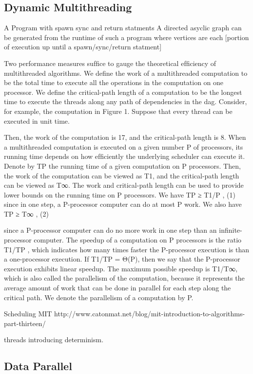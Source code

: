 \documentclass[main.tex]{subfiles}
\begin{document}
{{\subsection{Dynamic Multithreading}

A Program with spawn sync and return statments
A directed asyclic graph can be generated from the runtime of such a program where vertices are each [portion of execution up until a spawn/sync/return statment]

Two performance measures sufﬁce to gauge the theoretical efﬁciency of multithreaded algorithms. We deﬁne the work  of a multithreaded computation to be the total time to execute all the operations in the computation on one processor. We deﬁne the critical-path length  of a computation to be the longest time to execute the threads along any path of dependencies in the dag. Consider, for example, the computation in Figure 1. Suppose that every thread can be executed in unit time.

Then, the work of the computation is 17, and the critical-path length is 8. When a multithreaded computation is executed on a given number P of processors, its running time depends on how efﬁciently the underlying scheduler can execute it. Denote by TP the running time of a given computation on P processors. Then, the work of the computation can be viewed as T1, and the critical-path length can be viewed as T∞. The work and critical-path length can be used to provide lower bounds on the running time on P processors.
We have TP ≥ T1/P , (1)
since in one step, a P-processor computer can do at most P work.
We also have TP ≥ T∞ , (2)

since a P-processor computer can do no more work in one step than an infinite-processor computer. The speedup of a computation on P processors is the ratio T1/TP , which indicates how many times faster the P-processor execution is than a one-processor execution. If T1/TP = Θ(P), then
we say that the P-processor execution exhibits linear speedup. The maximum possible speedup is T1/T∞, which is also called the parallelism of the computation, because it represents the average amount of work that can be done in parallel for each step along the critical path. We denote the parallelism of a computation by P.


Scheduling
MIT http://www.catonmat.net/blog/mit-introduction-to-algorithms-part-thirteen/

threads introducing determinism\cite{Lee2006}.


\subsection{Data Parallel}

}}
\end{document}
